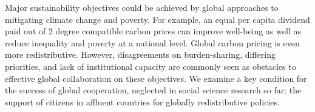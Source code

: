 \documentclass{nature}
\begin{document}






Major sustainability objectives could be achieved by global approaches to mitigating climate change and poverty.\cite{budolfson_climate_2021,franks_mobilizing_2018,dennig_inequality_2015,soergel_combining_2021} For example, an equal per capita dividend paid out of 2 degree compatible carbon prices can improve well-being as well as reduce inequality and poverty at a national level.\cite{budolfson_climate_2021} Global carbon pricing is even more redistributive.\cite{bauer_quantification_2020} 
However, disagreements on burden-sharing, differing priorities, and lack of institutional capacity are commonly seen as obstacles to effective global collaboration on these objectives.\cite{cramton_global_2017} We examine a key condition for the success of global cooperation, neglected in social science research so far: the support of citizens in affluent countries for globally redistributive policies.%
\end{document}

